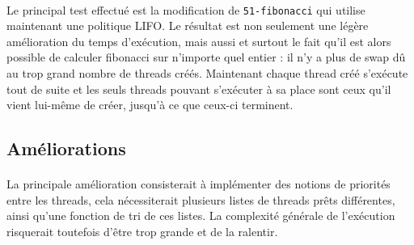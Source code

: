\paragraph{}
Le principal test effectué est la modification de \texttt{51-fibonacci} qui utilise maintenant une politique LIFO. Le résultat est non seulement une légère amélioration du temps d'exécution, mais aussi et surtout le fait qu'il est alors possible de calculer fibonacci sur n'importe quel entier : il n'y a plus de swap dû au trop grand nombre de threads créés. Maintenant chaque thread créé s'exécute tout de suite et les seuls threads pouvant s'exécuter à sa place sont ceux qu'il vient lui-même de créer, jusqu'à ce que ceux-ci terminent.

\subsection{Améliorations}

\paragraph{}
La principale amélioration consisterait à implémenter des notions de priorités entre les threads, cela nécessiterait plusieurs listes de threads prêts différentes, ainsi qu'une fonction de tri de ces listes. La complexité générale de l'exécution risquerait toutefois d'être trop grande et de la ralentir. 
